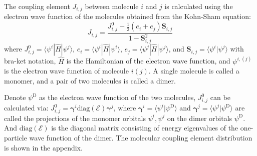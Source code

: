 \documentclass[letterpaper,12pt]{article}
\begin{document}
The coupling element $J_{i,j}$ between molecule $i$ and $j$ is calculated \cite{baumeier_density_2010} using the electron wave function of the molecules obtained from the Kohn-Sham equation: 
\begin{equation}
    J_{i,j} = \frac{ J^0_{i,j}- \frac{1}{2}(e_i+e_j)\mathbf{S}_{i,j} }{ 1- \mathbf{S}_{i,j}^2 }
    \label{equ:JAB}
\end{equation}
where $J^0_{i,j} = \langle \psi^i | \hat{H} | \psi^j \rangle $, $e_i = \langle \psi^i | \hat{H} | \psi^i \rangle $, $e_j = \langle \psi^j | \hat{H} | \psi^j \rangle $, and $\mathbf{S}_{i,j}=\langle \psi^i | \psi^j \rangle $ with bra-ket notation, $\hat{H}$ is the Hamiltonian of the electron wave function, and $\psi^{i,(j)}$ is the electron wave function of molecule $i(j)$. A single molecule is called a monomer, and a pair of two molecules is called a dimer.

Denote $\psi^\text{D}$ as the electron wave function of the two molecules,  $J^0_{i,j}$ can be calculated via:
$
    J^0_{i,j} = \mathbf{\gamma}^i \text{diag}(\mathcal{E}) \mathbf{\gamma}^j
$, 
where $\mathbf{\gamma}^i = \langle \psi^i | \psi^\text{D} \rangle$ and $\mathbf{\gamma}^j = \langle \psi^j | \psi^\text{D} \rangle$ are called the projections of the monomer orbitals $\psi^i, \psi^j$ on the dimer orbitals $\psi^\text{D}$. And $\text{diag}(\mathcal{E})$ is the diagonal matrix consisting of energy eigenvalues of the one-particle wave function of the dimer. The molecular coupling element distribution is shown in the appendix.
\end{document}
